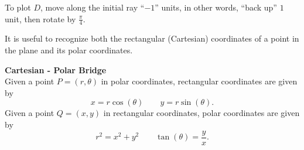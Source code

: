 \documentclass{ximera}
\begin{document}
\begin{example}
\begin{explanation}
  To plot $D$, move along the initial ray ``$-1$'' units, in other
  words, ``back up'' $1$ unit, then rotate
   by
  $\frac{\pi}{4}$.
  \begin{hint}
    \begin{image}
    \end{image}
  \end{hint}
\end{explanation}
\end{example}


















It is useful to recognize both the rectangular (Cartesian)
coordinates of a point in the plane and its polar coordinates.

\begin{theorem}  \textbf{\textcolor{green!50!black}{Cartesian - Polar Bridge}} \\

Given a point $P=(r,\theta)$ in polar coordinates, rectangular
coordinates are given by
\[
x=r\cos(\theta)\qquad y=r\sin(\theta).
\]
Given a point $Q=(x,y)$ in rectangular coordinates, polar coordinates
are given by
\[
r^2=x^2+y^2\qquad \tan(\theta) = \frac{y}{x}.
\]
\end{theorem}
\end{document}
